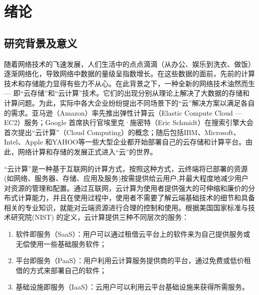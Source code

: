 
\chapter{绪论}
\label{chap:introduction}



\section{研究背景及意义}
\label{sec:instroduction_background}

 随着网络技术的飞速发展，人们生活中的点点滴滴（从办公、娱乐到洗衣、做饭）逐渐网络化，导致网络中数据的量级呈指数增长。在这些数据的面前，先前的计算技术和存储能力显得有些力不从心。在此背景之下，一种全新的网络技术油然而生 --- 即“云存储”和“云计算”技术。它们的出现分别从理论上解决了大数据的存储和计算问题。为此，实际中各大企业纷纷提出不同场景下的“云”解决方案以满足各自的需求。亚马逊（Amazon）率先推出弹性计算云（Elastic Compute Cloud --- EC2）服务\cite{walker2008benchmarking}；Google 首席执行官埃里克·施密特（Eric Schmidt）在搜索引擎大会首次提出“云计算”（Cloud Computing）\cite{bogatin2006google}的概念；随后包括IBM、Microsoft、Intel、Apple 和YAHOO等一些大型企业都开始部署自己的云存储和计算平台。由此，网络计算和存储的发展正式进入“云”的世界。

 “云计算”是一种基于互联网的计算方式，按照这种方式，云终端将已部署的资源(如网络、服务器、存储、应用及服务)按需提供给云用户,并最大程度地减少用户对资源的管理和配置\cite{mell2009nist}。通过互联网，云计算为使用者提供强大的可伸缩和廉价的分布式计算能力，并且在使用过程中，使用者不需要了解云端基础技术的细节和具备相关的专业知识，就能对云端资源进行合理的控制和使用。根据美国国家标准与技术研究院(NIST) 的定义\cite{above2009Armb}，云计算提供三种不同层次的服务：
 \begin{enumerate}
   \item
   软件即服务（SaaS）：用户可以通过租借云平台上的软件来为自己提供服务或无偿使用一些基础服务软件；

   \item
   平台即服务（PaaS）：用户利用云计算服务提供商的平台，通过免费或低价租借的方式来部署自己的软件；

   \item
   基础设施即服务（IaaS）：云用户可以利用云平台基础设施来获得所需服务。

 \end{enumerate}


